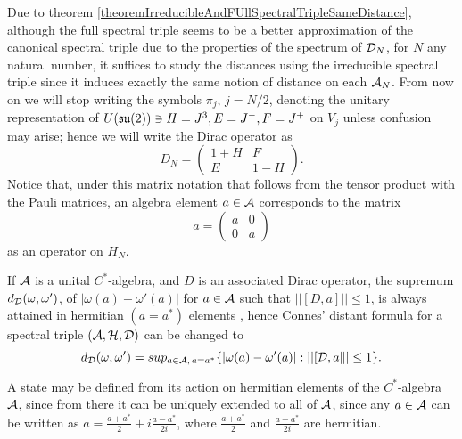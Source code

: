 Due to theorem \ref{theoremIrreducibleAndFUllSpectralTripleSameDistance}, although the full spectral triple seems to be a better approximation of the canonical spectral triple due to the properties of the spectrum of $\mathcal D_N$, for $N$ any natural number, it suffices to study the distances using the irreducible spectral triple since it induces exactly the same notion of distance on each $\mathcal A_N$. From now on we will stop writing the symbols $\pi_j$, $j = N/2$, denoting the unitary representation of $U(\mathfrak{su}(2)) \ni H = J^3, E = J^-, F = J^+$ on $V_j$ unless confusion may arise; hence we will write the Dirac operator as
\begin{equation}
    D_N = \begin{pmatrix} 1 + H & F \\ E & 1 - H\end{pmatrix}.
\end{equation}
Notice that, under this matrix notation that follows from the tensor product with the Pauli matrices, an algebra element $a \in \mathcal A$ corresponds to the matrix
\begin{equation}\label{aAsMatrixOperator}
    a = \begin{pmatrix} a & 0 \\ 0 & a \end{pmatrix}
\end{equation} as an operator on $H_N$.

\begin{remark}
If $\mathcal A$ is a unital $C^*$-algebra, and $D$ is an associated Dirac operator, the supremum  $d_\mathcal D(\omega, \omega')$, of $|\omega(a) - \omega'(a)|$ for $a \in \mathcal A$ such that $||[D, a]|| \leq 1$, is always attained in hermitian $(a = a^*)$ elements \cite{Iochum2001}, hence Connes' distant formula for a spectral triple $(\mathcal A, \mathcal H, \mathcal D)$ can be changed to
\begin{equation} \label{distanceFormulaHermitian}
    d_\mathcal D(\omega, \omega') = sup_{a \in \mathcal A, \,a = a^*} \{|\omega(a) - \omega'(a)| : ||[\mathcal D, a\|| \leq 1\}.
\end{equation}
\end{remark}

\begin{remark}
A state may be defined from its action on hermitian elements of the $C^*$-algebra $\mathcal A$, since from there it can be uniquely extended to all of $\mathcal A$, since any $a \in \mathcal A$ can be written as $a = \frac{a+a^*}{2} + i \frac{a - a^*}{2i}$, where $\frac{a+a^*}{2}$ and $\frac{a-a^*}{2i}$ are hermitian.
\end{remark}

